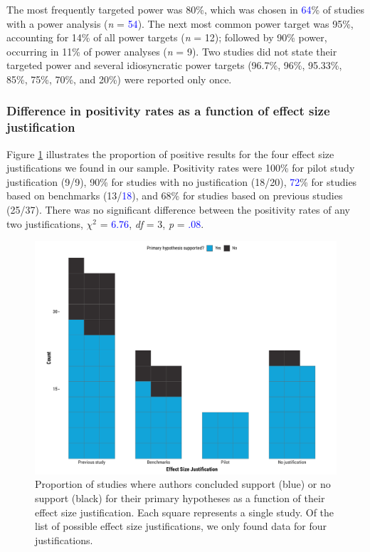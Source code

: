 \documentclass[
  man, donotrepeattitle,mask,floatsintext]{apa7}
\begin{document}
The most frequently targeted power was 80\%, which was chosen in \textcolor{blue}{64}\% of studies with a power analysis (\emph{n} = \textcolor{blue}{54}). The next most common power target was 95\%, accounting for 14\% of all power targets (\emph{n} = 12); followed by 90\% power, occurring in 11\% of power analyses (\emph{n} = 9). Two studies did not state their targeted power and several idiosyncratic power targets (96.7\%, 96\%, 95.33\%, 85\%, 75\%, 70\%, and 20\%) were reported only once.

\hypertarget{difference-in-positivity-rates-as-a-function-of-effect-size-justification}{%
\subsubsection{Difference in positivity rates as a function of effect size justification}\label{difference-in-positivity-rates-as-a-function-of-effect-size-justification}}

Figure \ref{fig:fig3} illustrates the proportion of positive results for the four effect size justifications we found in our sample. Positivity rates were 100\% for pilot study justification (9/9), 90\% for studies with no justification (18/20), \textcolor{blue}{72}\% for studies based on benchmarks (13/\textcolor{blue}{18}), and 68\% for studies based on previous studies (25/37). There was no significant difference between the positivity rates of any two justifications, \(\chi^2\) = \textcolor{blue}{6.76}, \emph{df} = 3, \emph{p} = \textcolor{blue}{.08}.

\pagebreak

\begin{figure}

{\centering \includegraphics{../../figs/fig3} 

}

\caption{Proportion of studies where authors concluded support (blue) or no support (black) for their primary hypotheses as a function of their effect size justification. Each square represents a single study. Of the list of possible effect size justifications, we only found data for four justifications.}\label{fig:fig3}
\end{figure}
\end{document}
